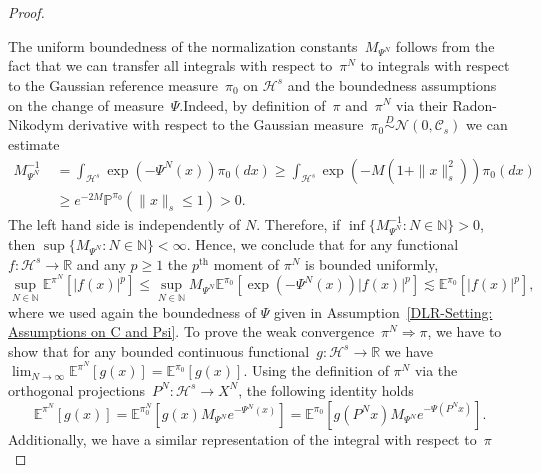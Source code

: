\begin{proof}\autocite[Lemma 3.5, Lemma 4.3]{Mattingly2010, Pillai2012}
  
 The uniform boundedness of the normalization constants~$M_{\Psi^N}$ follows from the fact that we can transfer all integrals with respect to~$\pi^N$ to integrals with respect to the Gaussian reference measure~$\pi_0$ on $\mathcal{H}^s$ and the boundedness assumptions on the change of measure~$\Psi$.Indeed, by definition of~$\pi$ and~$\pi^N$ via their Radon-Nikodym derivative with respect to the Gaussian measure~$\pi_0 \stackrel{D}{\sim} \mathcal{N}(0, \mathcal{C}_s)$ we can estimate
 \begin{equation*}
   \begin{split}
   M_{\Psi^N}^{-1} & \; = \int_{\mathcal{H}^s} \exp (-\Psi^N(x)) \pi_0(dx) \geq \int_{\mathcal{H}^s} \exp (-M(1+ \|x\|_s^2)) \pi_0(dx) \\
   & \; \geq e^{-2M} \mathbb{P}^{\pi_0}(\|x\|_s \leq 1) > 0.
   \end{split}
 \end{equation*}
 The left hand side is independently of $N$. Therefore, if $\inf \{ M_{\Psi^N}^{-1}: N \in \mathbb{N}\} > 0$, then $ \sup\{ M_{\Psi^N}: N \in \mathbb{N}\} < \infty$. Hence, we conclude that for any functional~$f: \mathcal{H}^s \to \mathbb{R}$ and any $p\geq 1$ the $p^{\text{th}}$ moment of $\pi^N$ is bounded uniformly,
 \begin{equation*}
  \sup_{N \in \mathbb{N}} \mathbb{E}^{\pi^N} [| f(x) |^p] \leq \sup_{N \in \mathbb{N}} M_{\Psi^N} \mathbb{E}^{\pi_0}[ \exp (-\Psi^N(x)) |f(x)|^p] \lesssim \mathbb{E}^{\pi_0}[|f(x)|^p],
 \end{equation*}
 where we used again the boundedness of $\Psi$ given in Assumption~\ref{DLR-Setting: Assumptions on C and Psi}. To prove the weak convergence~$\pi^N \Longrightarrow \pi$, we have to show that for any bounded continuous functional~$g: \mathcal{H}^s \to \mathbb{R}$ we have $\lim_{N \to \infty} \mathbb{E}^{\pi^N} [ g(x) ] = \mathbb{E}^{\pi_0}[g(x)]$. Using the definition of $\pi^N$ via the orthogonal projections~$P^N: \mathcal{H}^s \to X^N$, the following identity holds
 \begin{equation*}
   \mathbb{E}^{\pi^N} [g(x)] = \mathbb{E}^{\pi^N_0} [g(x)M_{\Psi^N} e^{-\Psi^N(x)} ] =  \mathbb{E}^{\pi_0}[ g(P^Nx) M_{\Psi^N} e^{-\Psi(P^Nx)} ].
 \end{equation*}
 Additionally, we have a similar representation of the integral with respect to~$\pi$
  \begin{equation*}

\end{equation*}
\end{proof}
